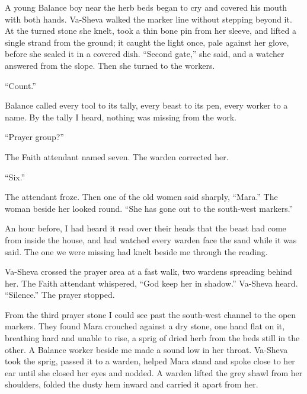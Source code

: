 A young Balance boy near the herb beds began to cry and covered his mouth with both hands. Va-Sheva walked the marker line without stepping beyond it. At the turned stone she knelt, took a thin bone pin from her sleeve, and lifted a single strand from the ground; it caught the light once, pale against her glove, before she sealed it in a covered dish. ``Second gate,'' she said, and a watcher answered from the slope. Then she turned to the workers. \par

``Count.''\par

Balance called every tool to its tally, every beast to its pen, every worker to a name. By the tally I heard, nothing was missing from the work.\par

``Prayer group?'' \par

The Faith attendant named seven. The warden corrected her.

``Six.'' \par

The attendant froze. Then one of the old women said sharply, ``Mara.'' The woman beside her looked round. ``She has gone out to the south-west markers.'' \par

An hour before, I had heard it read over their heads that the beast had come from inside the house, and had watched every warden face the sand while it was said. The one we were missing had knelt beside me through the reading.\par

Va-Sheva crossed the prayer area at a fast walk, two wardens spreading behind her. The Faith attendant whispered, ``God keep her in shadow.'' Va-Sheva heard. ``Silence.'' The prayer stopped.\par

From the third prayer stone I could see past the south-west channel to the open markers. They found Mara crouched against a dry stone, one hand flat on it, breathing hard and unable to rise, a sprig of dried herb from the beds still in the other. A Balance worker beside me made a sound low in her throat. Va-Sheva took the sprig, passed it to a warden, helped Mara stand and spoke close to her ear until she closed her eyes and nodded. A warden lifted the grey shawl from her shoulders, folded the dusty hem inward and carried it apart from her.\par


